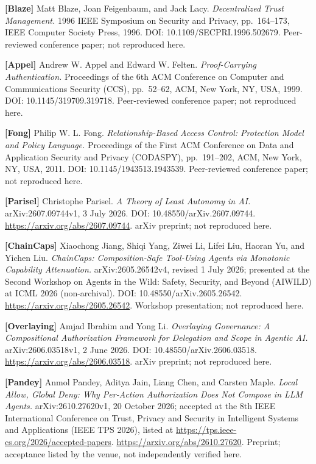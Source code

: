 \documentclass[
  10pt,
]{article}
\renewcommand{\_}{\allowbreak\origunderscore}
\begin{document}
\textbf{{[}Blaze{]}} Matt Blaze, Joan Feigenbaum, and Jack Lacy.
\emph{Decentralized Trust Management.} 1996 IEEE Symposium on Security
and Privacy, pp.~164--173, IEEE Computer Society Press, 1996. DOI:
10.1109/SECPRI.1996.502679. Peer-reviewed conference paper; not
reproduced here.

\textbf{{[}Appel{]}} Andrew W. Appel and Edward W. Felten.
\emph{Proof-Carrying Authentication.} Proceedings of the 6th ACM
Conference on Computer and Communications Security (CCS), pp.~52--62,
ACM, New York, NY, USA, 1999. DOI: 10.1145/319709.319718. Peer-reviewed
conference paper; not reproduced here.

\textbf{{[}Fong{]}} Philip W. L. Fong. \emph{Relationship-Based Access
Control: Protection Model and Policy Language.} Proceedings of the First
ACM Conference on Data and Application Security and Privacy (CODASPY),
pp.~191--202, ACM, New York, NY, USA, 2011. DOI:
10.1145/1943513.1943539. Peer-reviewed conference paper; not reproduced
here.

\textbf{{[}Parisel{]}} Christophe Parisel. \emph{A Theory of Least
Autonomy in AI.} arXiv:2607.09744v1, 3 July 2026. DOI:
10.48550/arXiv.2607.09744. \url{https://arxiv.org/abs/2607.09744}. arXiv
preprint; not reproduced here.

\textbf{{[}ChainCaps{]}} Xiaochong Jiang, Shiqi Yang, Ziwei Li, Lifei
Liu, Haoran Yu, and Yichen Liu. \emph{ChainCaps: Composition-Safe
Tool-Using Agents via Monotonic Capability Attenuation.}
arXiv:2605.26542v4, revised 1 July 2026; presented at the Second
Workshop on Agents in the Wild: Safety, Security, and Beyond (AIWILD) at
ICML 2026 (non-archival). DOI: 10.48550/arXiv.2605.26542.
\url{https://arxiv.org/abs/2605.26542}. Workshop presentation; not
reproduced here.

\textbf{{[}Overlaying{]}} Amjad Ibrahim and Yong Li. \emph{Overlaying
Governance: A Compositional Authorization Framework for Delegation and
Scope in Agentic AI.} arXiv:2606.03518v1, 2 June 2026. DOI:
10.48550/arXiv.2606.03518. \url{https://arxiv.org/abs/2606.03518}. arXiv
preprint; not reproduced here.

\textbf{{[}Pandey{]}} Anmol Pandey, Aditya Jain, Liang Chen, and Carsten
Maple. \emph{Local Allow, Global Deny: Why Per-Action Authorization Does
Not Compose in LLM Agents.} arXiv:2610.27620v1, 20 October 2026;
accepted at the 8th IEEE International Conference on Trust, Privacy and
Security in Intelligent Systems and Applications (IEEE TPS 2026), listed
at \url{https://tps.ieee-cs.org/2026/accepted-papers}.
\url{https://arxiv.org/abs/2610.27620}. Preprint; acceptance listed by
the venue, not independently verified here.
\end{document}
